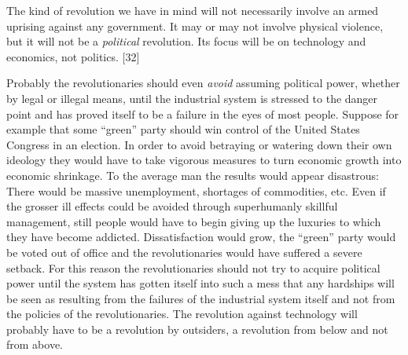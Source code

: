  The kind of revolution we have in mind will not necessarily involve an armed uprising against any government. It may or may not involve physical violence, but it will not be a {\em political} revolution. Its focus will be on technology and economics, not politics. [32]

 Probably the revolutionaries should even {\em avoid} assuming political power, whether by legal or illegal means, until the industrial system is stressed to the danger point and has proved itself to be a failure in the eyes of most people. Suppose for example that some “green” party should win control of the United States Congress in an election. In order to avoid betraying or watering down their own ideology they would have to take vigorous measures to turn economic growth into economic shrinkage. To the average man the results would appear disastrous: There would be massive unemployment, shortages of commodities, etc. Even if the grosser ill effects could be avoided through superhumanly skillful management, still people would have to begin giving up the luxuries to which they have become addicted. Dissatisfaction would grow, the “green” party would be voted out of office and the revolutionaries would have suffered a severe setback. For this reason the revolutionaries should not try to acquire political power until the system has gotten itself into such a mess that any hardships will be seen as resulting from the failures of the industrial system itself and not from the policies of the revolutionaries. The revolution against technology will probably have to be a revolution by outsiders, a revolution from below and not from above.

